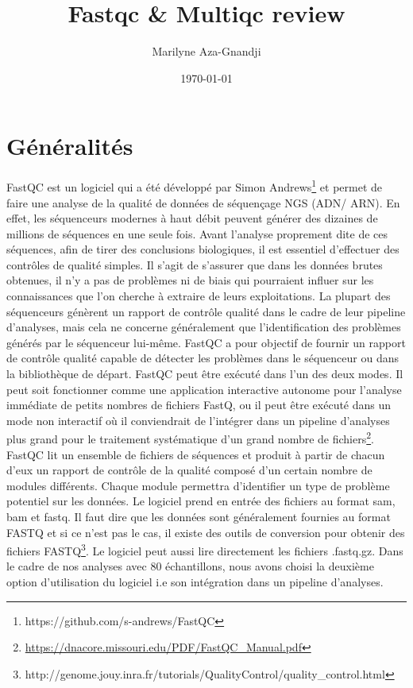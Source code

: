 \documentclass[a4paper,11pt]{article}
\begin{document}
\title{Fastqc \& Multiqc review}
\author{Marilyne Aza-Gnandji}
\date{\today}

\maketitle
\tableofcontents

\section{Généralités}

FastQC est un logiciel qui a été développé par Simon
Andrews\footnote{{https://github.com/s-andrews/FastQC}} et permet de
faire une analyse de la qualité de données de séquençage NGS (ADN/
ARN). En effet, les séquenceurs modernes à haut débit peuvent générer
des dizaines de millions de séquences en une seule fois.  Avant
l'analyse proprement dite de ces séquences, afin de tirer des
conclusions biologiques, il est essentiel d'effectuer des contrôles de
qualité simples.  Il s'agit de s'assurer que dans les données brutes
obtenues, il n'y a pas de problèmes ni de biais qui pourraient influer
sur les connaissances que l'on cherche à extraire de leurs
exploitations. La plupart des séquenceurs génèrent un rapport de
contrôle qualité dans le cadre de leur pipeline d’analyses, mais cela
ne concerne généralement que l’identification des problèmes générés
par le séquenceur lui-même. FastQC a pour objectif de fournir un
rapport de contrôle qualité capable de détecter les problèmes dans le
séquenceur ou dans la bibliothèque de départ. FastQC peut être exécuté
dans l'un des deux modes. Il peut soit fonctionner comme une
application interactive autonome pour l’analyse immédiate de petits
nombres de fichiers FastQ, ou il peut être exécuté dans un mode non
interactif où il conviendrait de l’intégrer dans un pipeline
d’analyses plus grand pour le traitement systématique d’un grand
nombre de
fichiers\footnote{\url{https://dnacore.missouri.edu/PDF/FastQC_Manual.pdf}}.
FastQC lit un ensemble de fichiers de séquences et produit à partir de
chacun d'eux un rapport de contrôle de la qualité composé d'un certain
nombre de modules différents. Chaque module permettra d'identifier un
type de problème potentiel sur les données. Le logiciel prend en
entrée des fichiers au format sam, bam et fastq. Il faut dire que les
données sont généralement fournies au format FASTQ et si ce n'est pas
le cas, il existe des outils de conversion pour obtenir des fichiers
FASTQ\footnote{{http://genome.jouy.inra.fr/tutorials/QualityControl/quality_control.html}}. Le
logiciel peut aussi lire directement les fichiers .fastq.gz.  Dans le
cadre de nos analyses avec 80 échantillons, nous avons choisi la
deuxième option d'utilisation du logiciel i.e son intégration dans un
pipeline d'analyses.
\end{document}
